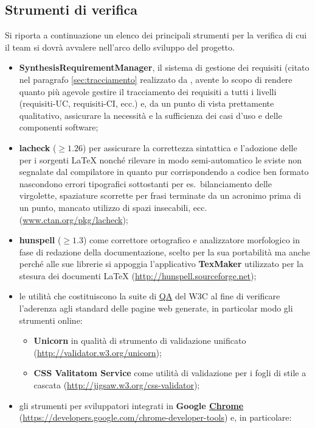 {\subsection{Strumenti di verifica}\label{sec:tools}
Si riporta a continuazione un elenco dei principali strumenti per la verifica di cui il team si dovrà avvalere nell'arco dello sviluppo del progetto.
\begin{itemize}
  \item \textbf{SynthesisRequirementManager}, il sistema di gestione dei requisiti (citato nel paragrafo \ref{sec:tracciamento} realizzato da \team, avente lo scopo di rendere quanto più agevole gestire il tracciamento dei requisiti a tutti i livelli (requisiti-UC, requisiti-CI, ecc.) e, da un punto di vista prettamente qualitativo, assicurare la necessità e la sufficienza dei casi d'uso e delle componenti software;
 \item \textbf{lacheck} ($\geq 1.26$) per assicurare la correttezza sintattica e l'adozione delle  per i sorgenti \LaTeX{} nonché rilevare in modo semi-automatico le sviste non segnalate dal compilatore in quanto pur corrispondendo a codice ben formato nascondono errori tipografici sottostanti per es.~bilanciamento delle virgolette, spaziature scorrette per frasi terminate da un acronimo prima di un punto, mancato utilizzo di spazi insecabili, ecc. (\url{www.ctan.org/pkg/lacheck});
 \item \textbf{hunspell} ($\geq 1.3$) come correttore ortografico e analizzatore morfologico in fase di redazione della documentazione, scelto per la sua portabilità ma anche perché alle sue librerie si appoggia l'applicativo \textbf{TexMaker} utilizzato per la stesura dei documenti \LaTeX{} (\url{http://hunspell.sourceforge.net});
 \item le utilità che costituiscono la suite di \underline{QA} del W3C al fine di verificare l'aderenza agli standard delle pagine web generate, in particolar modo gli strumenti online:
 \begin{itemize}
   \item \textbf{Unicorn} in qualità di strumento di validazione unificato (\url{http://validator.w3.org/unicorn});
   \item \textbf{CSS Valitatom Service} come utilità di validazione per i fogli di stile a cascata (\url{http://jigsaw.w3.org/css-validator});
 \end{itemize}
 \item gli strumenti per sviluppatori integrati in \textbf{Google \underline{Chrome}} (\url{https://developers.google.com/chrome-developer-tools}) e, in particolare:

\end{itemize}}
